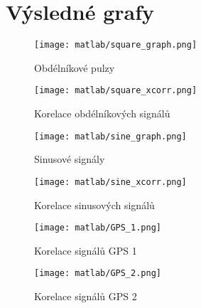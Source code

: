 \documentclass[11pt, a4paper]{article}
\begin{document}
    \section{Výsledné grafy}
    
            \begin{figure}[H]
                \centering
                \begin{minipage}{.5\textwidth}
                    \centering
                    \texttt{[image: matlab/square\_graph.png]}
                    \caption{Obdélníkové pulzy}
                    \label{fig:1}
                \end{minipage}%
                \begin{minipage}{.5\textwidth}
                    \centering
                    \texttt{[image: matlab/square\_xcorr.png]}
                    \caption{Korelace obdélníkových signálů}
                    \label{fig:2}
                \end{minipage}
            \end{figure}

            \begin{figure}[H]
                \centering
                \begin{minipage}{.5\textwidth}
                    \centering
                    \texttt{[image: matlab/sine\_graph.png]}
                    \caption{Sinusové signály}
                    \label{fig:3}
                \end{minipage}%
                \begin{minipage}{.5\textwidth}
                    \centering
                    \texttt{[image: matlab/sine\_xcorr.png]}
                    \caption{Korelace sinusových signálů}
                    \label{fig:4}
                \end{minipage}
            \end{figure}

            \begin{figure}[H]
                \centering
                \begin{minipage}{.5\textwidth}
                    \centering
                    \texttt{[image: matlab/GPS\_1.png]}
                    \caption{Korelace signálů GPS 1}
                    \label{fig:5}
                \end{minipage}%
                \begin{minipage}{.5\textwidth}
                    \centering
                    \texttt{[image: matlab/GPS\_2.png]}
                    \caption{Korelace signálů GPS 2}
                    \label{fig:6}
                \end{minipage}
            \end{figure}
\end{document}
